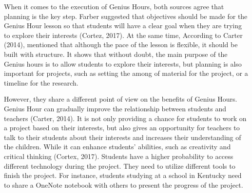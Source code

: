 \documentclass[12pt]{article}
\begin{document}
When it comes to the execution of Genius Hours, both sources agree that planning is the key step. Farber suggested that objectives should be made for the Genius Hour lesson so that students will have a clear goal when they are trying to explore their interests (Cortez, 2017). At the same time, According to Carter (2014), mentioned that although the pace of the lesson is flexible, it should be built with structure. It shows that without doubt, the main purpose of the Genius hours is to allow students to explore their interests, but planning is also important for projects, such as setting the among of material for the project, or a timeline for the research.


However, they share a different point of view on the benefits of Genius Hours. Genius Hour can gradually improve the relationship between students and teachers (Carter, 2014). It is not only providing a chance for students to work on a project based on their interests, but also gives an opportunity for teachers to talk to their students about their interests and increases their understanding of the children. While it can enhance students' abilities, such as creativity and critical thinking (Cortex, 2017). Students have a higher probability to access different technology during the project. They need to utilize different tools to finish the project. For instance, students studying at a school in Kentucky need to share a OneNote notebook with others to present the progress of the project.
\end{document}
